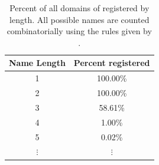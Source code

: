 \begin{table}
\begin{tabular}{c | c}
Name Length      & Percent registered \\ \hline
1                & 100.00\%              \\
2                & 100.00\%              \\
3                & 58.61\%               \\
4                & 1.00\%                \\
5                & 0.02\%               \\
$\vdots$         & $\vdots$         
\end{tabular}
\caption{Percent of all domains of registered by length. All possible names are counted combinatorially using the rules given by \cite{bitdnsspec}.}
\label{table:names_available}
\end{table}

